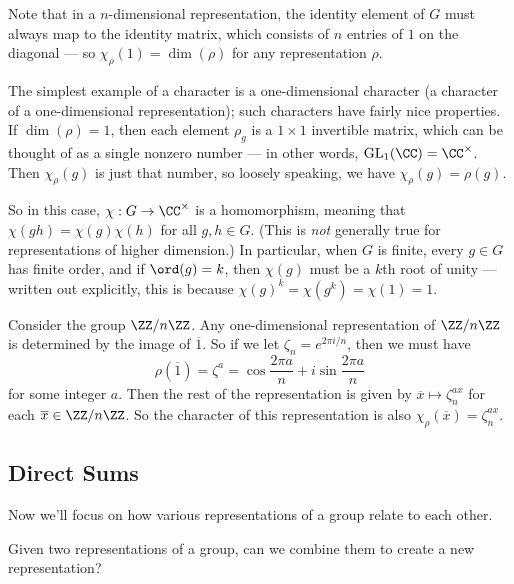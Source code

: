 Note that in a $n$-dimensional representation, the identity element of $G$ must always map to the identity matrix, which consists of $n$ entries of $1$ on the diagonal --- so $\chi_\rho(1) = \dim(\rho)$ for any representation $\rho$.

The simplest example of a character is a one-dimensional character (a character of a one-dimensional representation); such characters have fairly nice properties. If $\dim(\rho) = 1$, then each element $\rho_g$ is a $1 \times 1$ invertible matrix, which can be thought of as a single nonzero number --- in other words, $\operatorname{GL}_1(\CC) = \CC^\times$. Then $\chi_\rho(g)$ is just that number, so loosely speaking, we have $\chi_\rho(g) = \rho(g)$. 

So in this case, $\chi : G \to \CC^\times$ is a homomorphism, meaning that $\chi(gh) = \chi(g)\chi(h)$ for all $g, h \in G$. (This is \emph{not} generally true for representations of higher dimension.) In particular, when $G$ is finite, every $g \in G$ has finite order, and if $\ord(g) = k$, then $\chi(g)$ must be a $k$th root of unity --- written out explicitly, this is because $\chi(g)^k = \chi(g^k) = \chi(1) = 1$. 
 
\begin{example}
    Consider the group $\ZZ/n\ZZ$. Any one-dimensional representation of $\ZZ/n\ZZ$ is determined by the image of $\overline{1}$. So if we let $\zeta_n = e^{2\pi i/n}$, then we must have \[\rho(\overline{1}) = \zeta^a = \cos \frac{2\pi a}{n} + i \sin \frac{2\pi a}{n}\] for some integer $a$. Then the rest of the representation is given by $\overline{x} \mapsto \zeta_n^{ax}$ for each $\overline{x} \in \ZZ/n\ZZ$. So the character of this representation is also $\chi_\rho(\overline{x}) = \zeta_n^{ax}$.
\end{example}
 
\subsection{Direct Sums}

Now we'll focus on how various representations of a group relate to each other. 


\begin{qq}
Given two representations of a group, can we combine them to create a new representation?
\end{qq}

